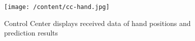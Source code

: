 \begin{figure}
	[h] \centering 
	\texttt{[image: /content/cc-hand.jpg]} \caption{Control Center displays received data of hand positions and prediction results} \label{fg:cc:hand} 
\end{figure}
